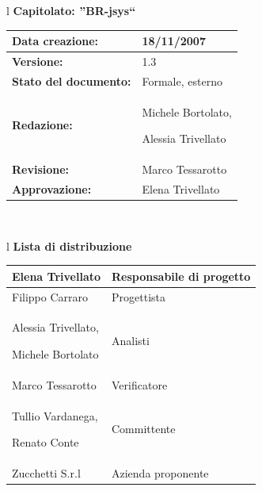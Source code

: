 \documentclass[11pt,titlepage,a4paper]{report}
\begin{document}
\begin{center}
\thispagestyle{plain}
\begin{table}[htbp]
\large{
\begin{tabular}{l}
\Large{\textbf{\textsf{Capitolato: ''BR-jsys``}}} \\
\begin{tabular}{||p{6cm}||p{6cm}||}
\hline
\textbf{Data creazione:} & 18/11/2007 \\
\hline
\textbf{Versione:} & 1.3 \\
\hline
\textbf{Stato del documento:} & Formale, esterno \\
\hline
\textbf{Redazione:} & Michele Bortolato, 

Alessia Trivellato \\
\hline
\textbf{Revisione:} &   Marco Tessarotto \\
\hline
\textbf{Approvazione:}  & Elena Trivellato\\
\hline
\end{tabular} \\
\end{tabular}
}
\end{table}

\begin{table}[hbtp]
\large{
\begin{tabular}{l}
\Large{\textbf{\textsf{Lista di distribuzione}}} \\
\begin{tabular}{||p{6cm}||p{6cm}||}
\hline
{Elena Trivellato}& Responsabile di progetto \\ 
\hline 
{Filippo Carraro}& Progettista \\ 
\hline
{Alessia Trivellato, 

Michele Bortolato}& Analisti \\
\hline
{Marco Tessarotto}& Verificatore \\
\hline
{Tullio Vardanega,

Renato Conte}& Committente \\
\hline 
{Zucchetti S.r.l}& Azienda proponente\\
\hline
\hline
\end{tabular} \\
\end{tabular}
}
\end{table}


\end{center}
\end{document}
